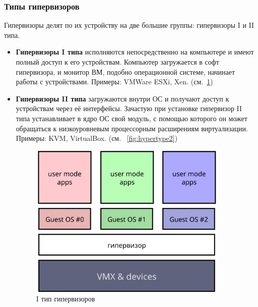 \documentclass[a4paper,11pt]{extarticle}
\begin{document}
	\subsubsection{Типы гипервизоров} \label{sssec:hyptype}
	Гипервизоры делят по их устройству на две большие группы: гипервизоры I и II типа.
	\begin{itemize}
		\item \textbf{Гипервизоры I типа} исполняются непосредственно на компьютере и имеют полный доступ к его устройствам. Компьютер загружается в софт гипервизора, и монитор ВМ, подобно операционной системе, начинает работы с устройствами. Примеры: VMWare ESXi, Xen. (см.~\cref{fig:hypertype1})
		\item \textbf{Гипервизоры II типа} загружаются внутри ОС и получают доступ к устройствам через её интерфейсы. Зачастую при установке гипервизор II типа устанавливает в ядро ОС свой модуль, с помощью которого он может обращаться к низкоуровневым процессорным расширениям виртуализации. Примеры: KVM, VirtualBox. (см. ~\cref{fig:hypertype2})\par
		\begin{figure}[htb]
			\centering
			\begin{minipage}{0.45\textwidth}
				\centering
				\includegraphics[width=0.9\textwidth]{../diagrams/hyper_type1.png} %
				\caption{I тип гипервизоров}
				\label{fig:hypertype1}
			\end{minipage}\hfill
			\begin{minipage}{0.45\textwidth}
				\centering

\end{minipage}
\end{figure}
\end{itemize}
\end{document}
